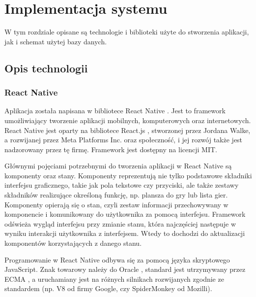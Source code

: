 \chapter{Implementacja systemu}
\thispagestyle{chapterBeginStyle}

	W tym rozdziale opisane są technologie i biblioteki użyte do stworzenia aplikacji, jak i schemat 
użytej bazy danych.



\section{Opis technologii}


\subsection{React Native}
	Aplikacja została napisana w bibliotece React Native \cite{React-Native}. Jest to framework
umożliwiający tworzenie aplikacji mobilnych, komputerowych oraz internetowych. React Native jest oparty
na bibliotece React.js \cite{React-Js}, stworzonej przez Jordana Walke, a rozwijanej przez
Meta Platforms Inc. oraz społeczność, i jej rozwój także jest nadzorowany przez tę firmę. Framework
jest dostępny na licencji MIT.

	Głównymi pojęciami potrzebnymi do tworzenia aplikacji w React Native są komponenty oraz stany.
Komponenty reprezentują nie tylko podstawowe składniki interfejsu graficznego, takie jak pola tekstowe czy 
przyciski, ale także zestawy składników realizujące określoną funkcję, np. plansza do gry lub
lista gier. Komponenty opierają się o stan, czyli zestaw informacji przechowywany w komponencie i
komunikowany do użytkownika za pomocą interfejsu. Framework odświeża wygląd interfejsu przy zmianie
stanu, która najczęściej następuje w wyniku interakcji użytkownika z interfejsem. Wtedy to dochodzi
do aktualizacji komponentów korzystających z danego stanu.

	Programowanie w React Native odbywa się za pomocą języka skryptowego JavaScript. Znak towarowy
należy do Oracle \cite{JS-Oracle}, standard jest utrzymywany przez ECMA \cite{JS-ECMA}, 
a uruchamiany jest na różnych silnikach rozwijanych zgodnie ze standardem 
(np. V8 \cite{JS-V8} od firmy Google, czy SpiderMonkey \cite{JS-SpiderMonkey} od Mozilli).


